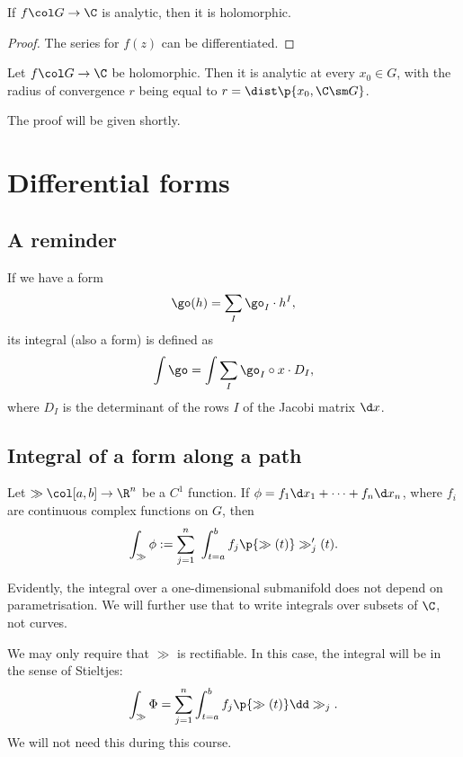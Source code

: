 \begin{lemma}
  If $f \col G \to \C$ is analytic, then it is holomorphic.
\end{lemma}

\begin{proof}
  The series for $f(z)$ can be differentiated.
\end{proof}

\begin{theorem}[Cauchy]
  Let $f \col G \to \C$ be holomorphic.
  Then it is analytic at every $x_0 \in G$, with the radius of convergence $r$ being equal to $r = \dist\p{x_0, \C \sm G}$. 
\end{theorem}

The proof will be given shortly.

\section{Differential forms}

\subsection{A reminder}

\begin{definition}
  If we have a form
  $$ \go(h) = \sum_I \go_I \cdot h^I, $$
  its integral (also a form) is defined as
  $$ \int \go = \int \sum_I \go_I \circ x \cdot D_I, $$
  where $D_I$ is the determinant of the rows $I$ of the Jacobi matrix $\d x$.
\end{definition}

\subsection{Integral of a form along a path}

\begin{definition} 
  Let $\gg \col [a, b] \to \R^n$ be a $C^1$ function. If $\phi = f_1 \d x_1 + \dots + f_n \d x_n$, where $f_i$ are continuous complex functions on $G$, then
$$ \int_\gg \phi := \sum_{j=1}^n\ \int_{t=a}^b f_j\p{\gg(t)} \gg'_j(t). $$
\end{definition}

Evidently, the integral over a one-dimensional submanifold does not depend on parametrisation. We will further use that to write integrals over subsets of $\C$, not curves.

\begin{remark}
  We may only require that $\gg$ is rectifiable.
  In this case, the integral will be in the sense of Stieltjes:
  $$ \int_\gg \Phi = \sum_{j=1}^n \int_{t=a}^b f_j\p{\gg(t)} \dd \gg_j. $$
  We will not need this during this course.
\end{remark}

